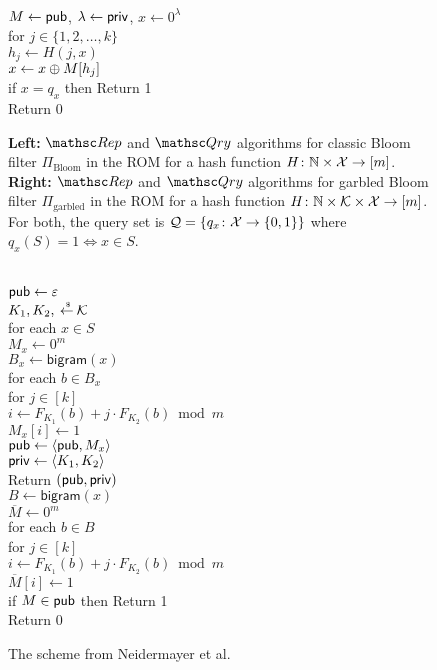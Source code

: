 \begin{figure}[pt]
{{\medskip
{}\\
$M \gets {\sf pub}$, $\lambda \gets {\sf priv}$, $x \gets 0^\lambda$\\
for $j \in \{1,2,\dots,k\}$\\
\nudge $h_j \gets H(j,x)$\\
\nudge $x \gets x {\:\oplus\:} M[h_j]$\\
if $x = q_x$ then Return 1\\
Return 0
}
}
\caption{{\bf Left:} $\Rep$ and $\Qry$ algorithms for classic Bloom
  filter $\Pi_{\mathrm{Bloom}}$ in the ROM for a hash function $H\colon \mathbb{N} \times
  {\cal X} \to [m]$. {\bf Right:} $\Rep$ and $\Qry$ algorithms for garbled Bloom
  filter $\Pi_{\mathrm{garbled}}$ in the ROM for a hash function $H\colon \mathbb{N} \times {\cal K}
 \times {\cal X} \to [m]$. For both, the query set is ${\cal Q}=\{q_x\colon
  {\cal X} \to \{0,1\}\}$ where $q_x(S)=1 \Leftrightarrow x \in S$.  }
\label{fig:bf-and-garbled-bf}
\end{figure}

\begin{figure}
\centering
{}
{\\
${\sf pub} \gets \varepsilon$\\
$K_1,K_2, {\:\stackrel{{\scriptscriptstyle \hspace{0.2em}\$}} {\leftarrow}\:} {\cal K}$\\
for each $x \in S$\\
\nudge $M_x \gets 0^m$\\
\nudge $B_x \gets \mathsf{bigram}(x)$\\
\nudge for each $b \in B_x$\\
\nudge\nudge for $j \in [k]$\\
\nudge\nudge\nudge $i \gets F_{K_1}(b)+j\cdot F_{K_2}(b) \bmod m$\\
\nudge\nudge\nudge $M_x[i] \gets 1$\\
\nudge ${\sf pub} \gets \langle{\sf pub}, M_x \rangle$\\
${\sf priv} \gets \langle K_1,K_2 \rangle$\\
Return $({\sf pub},{\sf priv})$
}
{
\\
$B \gets \mathsf{bigram}(x)$\\
$\overline{M} \gets 0^m$\\
for each $b \in B$\\
\nudge for $j \in [k]$\\
\nudge\nudge $i \gets F_{K_1}(b)+j\cdot F_{K_2}(b) \bmod m$\\
\nudge\nudge $\overline{M}[i] \gets 1$\\
if $M \in {\sf pub}$ then Return 1 \\
Return 0
}
\caption{The scheme from Neidermayer et al.\cite{xxx}}
\label{fig: neidermayer}
\end{figure}